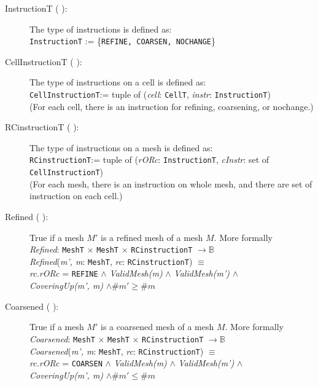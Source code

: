 \documentclass[12pt,titlepage]{article}
\begin{document}
\begin{description}
\item [InstructionT ( \dtheddnum \label{dInstructionT}):] The type of instructions is defined as:\\
{\tt InstructionT} := \{{\tt REFINE, COARSEN, NOCHANGE}\}

\item [CellInstructionT ( \dtheddnum \label{dCellInstructionT}):] The type of instructions on a cell is defined as:\\
{\tt CellInstructionT}:= tuple of ({\it cell}: {\tt CellT}, {\it instr}: {\tt InstructionT})\\
(For each cell, there is an instruction for refining, coarsening, or nochange.) 

\item [RCinstructionT ( \dtheddnum \label{dRCInstructionT}):] The type of instructions on a mesh is defined as:\\
{\tt RCinstructionT}:= tuple of ({\it rORc}: {\tt InstructionT}, {\it cInstr}: set of {\tt CellInstructionT})\\
(For each mesh, there is an instruction on whole mesh, and there are set of instruction on each cell.)

\item [Refined ( \dtheddnum \label{dRefined}):] True if a mesh $M'$ is a refined mesh of a mesh $M$. More formally\\
{\it Refined}: {\tt MeshT} $\times$ {\tt MeshT} $\times$ {\tt RCinstructionT} $\rightarrow \mathbb{B}$\\
{\it Refined}({\it m', m}: {\tt MeshT}, {\it rc}: {\tt RCinstructionT}) $\equiv$ \\
{\it rc.rORc} = {\tt REFINE} $\wedge$ {\it ValidMesh(m)} $\wedge$ {\it ValidMesh(m')} $\wedge$ \\
{\it CoveringUp(m', m)} $\wedge \# m' \geq \#m$

\item [Coarsened ( \dtheddnum \label{dCoarsened}):] True if a mesh $M'$ is a coarsened mesh of a mesh $M$. More formally \\
{\it Coarsened}: {\tt MeshT} $\times$ {\tt MeshT} $\times$ {\tt RCinstructionT} $\rightarrow \mathbb{B}$\\
{\it Coarsened}({\it m', m}: {\tt MeshT}, {\it rc}: {\tt RCinstructionT}) $\equiv$ \\
{\it rc.rORc} = {\tt COARSEN} $\wedge$ {\it ValidMesh(m)} $\wedge$ {\it ValidMesh(m')} $\wedge$ \\
{\it CoveringUp(m', m)} $\wedge \# m' \leq \# m$

\end{description}
\end{document}
